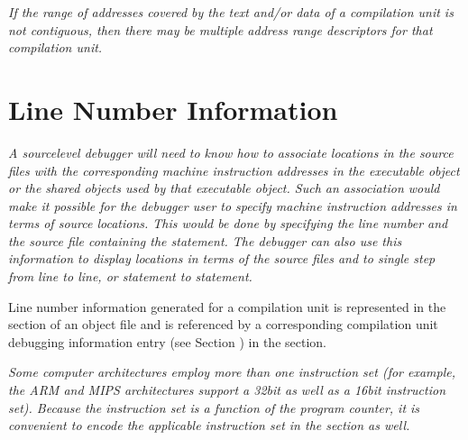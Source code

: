 \textit{If the range of addresses covered by the text and/or data
of a compilation unit is not contiguous, then there may be
multiple address range descriptors for that compilation unit.}




\section{Line Number Information}
\label{chap:linenumberinformation}
\textit{A source\dash level debugger will need to know how to
associate locations in the source files with the corresponding
machine instruction addresses in the executable object or
the shared objects used by that executable object. Such an
association would make it possible for the debugger user
to specify machine instruction addresses in terms of source
locations. This would be done by specifying the line number
and the source file containing the statement. The debugger
can also use this information to display locations in terms
of the source files and to single step from line to line,
or statement to statement.}

Line number information generated for a compilation unit is
represented in the 
\dotdebugline{} section of an object file and
is referenced by a corresponding compilation unit debugging
information entry 
(see Section ) 
in the \dotdebuginfo{}
section.

\textit{Some computer architectures employ more than one instruction
set (for example, the ARM 
and 
MIPS architectures support
a 32\dash bit as well as a 16\dash bit instruction set). Because the
instruction set is a function of the program counter, it is
convenient to encode the applicable instruction set in the
\dotdebugline{} section as well.}

